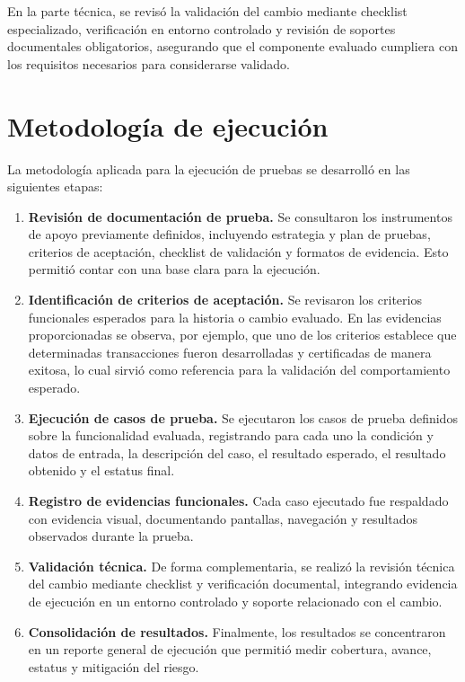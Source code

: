 \documentclass[12pt]{article}
\begin{document}
En la parte técnica, se revisó la validación del cambio mediante checklist especializado, verificación en entorno controlado y revisión de soportes documentales obligatorios, asegurando que el componente evaluado cumpliera con los requisitos necesarios para considerarse validado.

\section*{Metodología de ejecución}

La metodología aplicada para la ejecución de pruebas se desarrolló en las siguientes etapas:

\begin{enumerate}[label=\arabic*.]
    \item \textbf{Revisión de documentación de prueba.} Se consultaron los instrumentos de apoyo previamente definidos, incluyendo estrategia y plan de pruebas, criterios de aceptación, checklist de validación y formatos de evidencia. Esto permitió contar con una base clara para la ejecución.

    \item \textbf{Identificación de criterios de aceptación.} Se revisaron los criterios funcionales esperados para la historia o cambio evaluado. En las evidencias proporcionadas se observa, por ejemplo, que uno de los criterios establece que determinadas transacciones fueron desarrolladas y certificadas de manera exitosa, lo cual sirvió como referencia para la validación del comportamiento esperado.

    \item \textbf{Ejecución de casos de prueba.} Se ejecutaron los casos de prueba definidos sobre la funcionalidad evaluada, registrando para cada uno la condición y datos de entrada, la descripción del caso, el resultado esperado, el resultado obtenido y el estatus final.

    \item \textbf{Registro de evidencias funcionales.} Cada caso ejecutado fue respaldado con evidencia visual, documentando pantallas, navegación y resultados observados durante la prueba.

    \item \textbf{Validación técnica.} De forma complementaria, se realizó la revisión técnica del cambio mediante checklist y verificación documental, integrando evidencia de ejecución en un entorno controlado y soporte relacionado con el cambio.

    \item \textbf{Consolidación de resultados.} Finalmente, los resultados se concentraron en un reporte general de ejecución que permitió medir cobertura, avance, estatus y mitigación del riesgo.
\end{enumerate}
\end{document}
